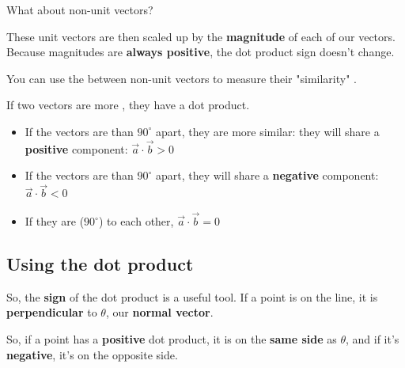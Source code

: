         
        What about non-unit vectors?
        
        These unit vectors are then scaled up by the \textbf{magnitude} of each of our vectors. Because magnitudes are \textbf{always positive}, the dot product sign doesn't change.\\
        
        \begin{concept}
            You can use the  between non-unit vectors to measure their "similarity" . 
            
            If two vectors are more , they have a  dot product. 
            
            \begin{itemize}
                \item If the vectors are  than $90^{\circ}$ apart, they are more similar: they will share a \textbf{positive} component: $\vec{a} \cdot \vec{b} > 0$
                
                \item If the vectors are  than $90^{\circ}$ apart, they will share a \textbf{negative} component: $\vec{a} \cdot \vec{b} < 0$
                
                \item If they are  ($90^{\circ}$) to each other, $\vec{a} \cdot \vec{b} = 0$
            \end{itemize}
        \end{concept}
        
    \subsection{Using the dot product}
        
        So, the \textbf{sign} of the dot product is a useful tool. If a point is on the line, it is \textbf{perpendicular} to $\theta$, our \textbf{normal vector}.
        
        So, if a point has a \textbf{positive} dot product, it is on the \textbf{same side} as $\theta$, and if it's \textbf{negative}, it's on the opposite side.
        
